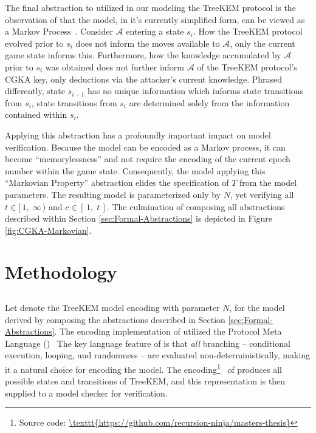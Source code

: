 \documentclass[runningheads]{llncs}
\newcommand{\Adversary}{\ensuremath{\mathcal{A}}\xspace}
\newcommand{\NumericRange}[2]{\ensuremath{\left[\,#1,\; #2\,\right]}\xspace}
\newcommand{\NumericRangeOpenR}[2]{\ensuremath{[\,#1,\; #2\,)}\xspace}
\begin{document}
The final abstraction to utilized in our modeling the TreeKEM protocol is the observation of that the model, in it's currently simplified form, can be viewed as a Markov Process~\cite{markov1906a}.
Consider \Adversary entering a \CGKAsec state $s_{i}$.
How the TreeKEM protocol evolved prior to $s_{i}$ does not inform the moves available to \Adversary, only the current game state informs this.
Furthermore, how the knowledge accumulated by \Adversary prior to $s_{i}$ was obtained does not further inform \Adversary of the TreeKEM protocol's CGKA key, only deductions via the attacker's current knowledge.
Phrased differently, state $s_{i-1}$ has no unique information which informs state transitions from $s_{i}$, state transitions from $s_{i}$ are determined solely from the information contained within $s_{i}$.

Applying this abstraction has a profoundly important impact on model verification.
Because the model can be encoded as a Markov process, it can become ``memorylessness'' and not require the encoding of the current epoch number within the game state.
Consequently, the model applying this ``Markovian Property'' abstraction elides the specification of $T$ from the model parameters.
The resulting model is parameterized only by $N$, yet verifying all $t \in \NumericRangeOpenR{1}{\infty}$ and $c \in \NumericRange{1}{t}$.
The culmination of composing all abstractions described within Section \ref{sec:Formal-Abstractions} is depicted in Figure \ref{fig:CGKA-Markovian}.



\section{Methodology}

\subsection{\Promela}

Let  denote the TreeKEM model encoding with parameter $N$, for the model derived by composing the abstractions described in Section \ref{sec:Formal-Abstractions}.
The encoding implementation of  utilized the Protocol Meta Language (\Promela)~\cite{HolzmannSpinBook2003, holzmann1990design}
The key language feature of \Promela is that \emph{all} branching -- conditional execution, looping, and randomness -- are evaluated non-deterministically, making it a natural choice for encoding the model.
The \Promela encoding\footnote{Source code: \url{\texttt{https://github.com/recursion-ninja/masters-thesis}}}\ %
of  produces all possible states and transitions of TreeKEM, and this representation is then supplied to a model checker for verification.
\end{document}
